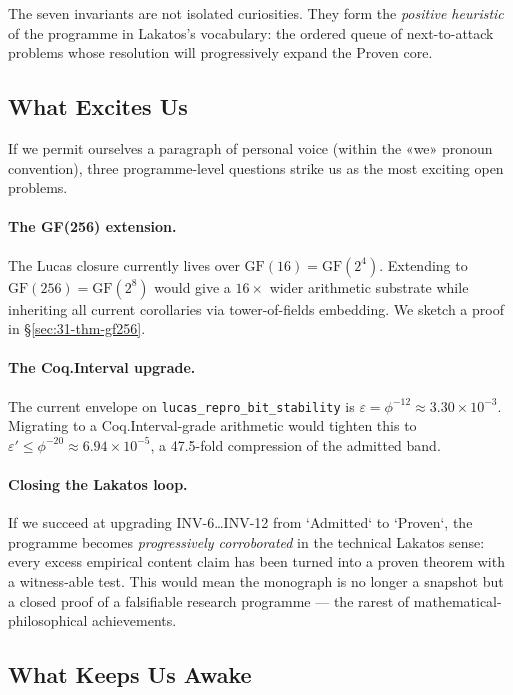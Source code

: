 The seven invariants are not isolated curiosities. They form the \emph{positive heuristic} of the programme in Lakatos's vocabulary: the ordered queue of next-to-attack problems whose resolution will progressively expand the Proven core.

\subsection{What Excites Us}
\label{sec:31-what-excites}

If we permit ourselves a paragraph of personal voice (within the «we» pronoun convention), three programme-level questions strike us as the most exciting open problems.

\paragraph{The GF(256) extension.} The Lucas closure currently lives over $\mathrm{GF}(16) = \mathrm{GF}(2^{4})$. Extending to $\mathrm{GF}(256) = \mathrm{GF}(2^{8})$ would give a $16 \times$ wider arithmetic substrate while inheriting all current corollaries via tower-of-fields embedding. We sketch a proof in §\ref{sec:31-thm-gf256}.

\paragraph{The Coq.Interval upgrade.} The current envelope on \texttt{lucas\_repro\_bit\_stability} is $\varepsilon = \phi^{-12} \approx 3.30 \times 10^{-3}$. Migrating to a Coq.Interval-grade arithmetic would tighten this to $\varepsilon' \leq \phi^{-20} \approx 6.94 \times 10^{-5}$, a 47.5-fold compression of the admitted band.

\paragraph{Closing the Lakatos loop.} If we succeed at upgrading INV-6…INV-12 from `Admitted` to `Proven`, the programme becomes \emph{progressively corroborated} in the technical Lakatos sense: every excess empirical content claim has been turned into a proven theorem with a witness-able test. This would mean the monograph is no longer a snapshot but a closed proof of a falsifiable research programme — the rarest of mathematical-philosophical achievements.

\subsection{What Keeps Us Awake}
\label{sec:31-keeps-awake}

